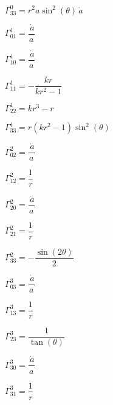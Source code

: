 \longeq\hspace*{-3em}$\displaystyle
\Gamma^{0}_{33}=r^{2} a \sin^{2}{\left(\theta \right)} \,\dot{a}
$\longeqend

\longeq\hspace*{-3em}$\displaystyle
\Gamma^{1}_{01}=\dfrac{\,\dot{a}}{a}
$\longeqend

\longeq\hspace*{-3em}$\displaystyle
\Gamma^{1}_{10}=\dfrac{\,\dot{a}}{a}
$\longeqend

\longeq\hspace*{-3em}$\displaystyle
\Gamma^{1}_{11}=- \dfrac{k r}{k r^{2} - 1}
$\longeqend

\longeq\hspace*{-3em}$\displaystyle
\Gamma^{1}_{22}=k r^{3} - r
$\longeqend

\longeq\hspace*{-3em}$\displaystyle
\Gamma^{1}_{33}=r \left(k r^{2} - 1\right) \sin^{2}{\left(\theta \right)}
$\longeqend

\longeq\hspace*{-3em}$\displaystyle
\Gamma^{2}_{02}=\dfrac{\,\dot{a}}{a}
$\longeqend

\longeq\hspace*{-3em}$\displaystyle
\Gamma^{2}_{12}=\dfrac{1}{r}
$\longeqend

\longeq\hspace*{-3em}$\displaystyle
\Gamma^{2}_{20}=\dfrac{\,\dot{a}}{a}
$\longeqend

\longeq\hspace*{-3em}$\displaystyle
\Gamma^{2}_{21}=\dfrac{1}{r}
$\longeqend

\longeq\hspace*{-3em}$\displaystyle
\Gamma^{2}_{33}=- \dfrac{\sin{\left(2 \theta \right)}}{2}
$\longeqend

\longeq\hspace*{-3em}$\displaystyle
\Gamma^{3}_{03}=\dfrac{\,\dot{a}}{a}
$\longeqend

\longeq\hspace*{-3em}$\displaystyle
\Gamma^{3}_{13}=\dfrac{1}{r}
$\longeqend

\longeq\hspace*{-3em}$\displaystyle
\Gamma^{3}_{23}=\dfrac{1}{\tan{\left(\theta \right)}}
$\longeqend

\longeq\hspace*{-3em}$\displaystyle
\Gamma^{3}_{30}=\dfrac{\,\dot{a}}{a}
$\longeqend

\longeq\hspace*{-3em}$\displaystyle
\Gamma^{3}_{31}=\dfrac{1}{r}
$\longeqend

